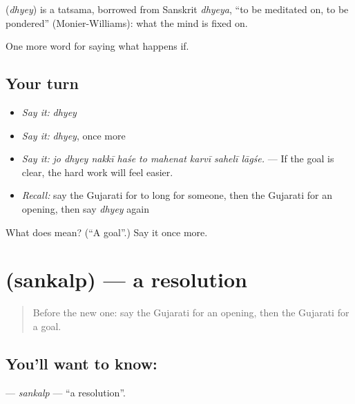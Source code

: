 \begin{cousinweb}
\textbf{} (\emph{dhyey}) is a tatsama, borrowed from Sanskrit \emph{dhyeya}, \textquotedblleft{}to be meditated on, to be pondered\textquotedblright{} (Monier-Williams): what the mind is fixed on.
\end{cousinweb}

\begin{grammarlens}[title={What you've built}]
One more word for saying what happens if.
\end{grammarlens}

\subsection*{Your turn}
\begin{itemize}
\raggedright
  \item \emph{Say it:} \emph{dhyey}
  \item \emph{Say it:} \emph{dhyey}, once more
  \item \emph{Say it:} \emph{jo dhyey nakkī haśe to mahenat karvī sahelī lāgśe.} — If the goal is clear, the hard work will feel easier.
  \item \emph{Recall:} say the Gujarati for to long for someone, then the Gujarati for an opening, then say \emph{dhyey} again
\end{itemize}

\begin{tcolorbox}[breakable,colback=teal!4,colframe=teal!35!black,title={Before you move on}]
What does  mean? (\textquotedblleft{}A goal\textquotedblright{}.) Say it once more.
\end{tcolorbox}
\section[\texorpdfstring{\gu{સંકલ્પ} (sankalp)}{સંકલ્પ (sankalp)}]{ (sankalp) — a resolution}

\label{lesson:GU-C382-sankalp}



\begin{quote}
Before the new one: say the Gujarati for an opening, then the Gujarati for a goal.
\end{quote}

\subsection*{You'll want to know: }
\textbf{} — \emph{sankalp} — \textquotedblleft{}a resolution\textquotedblright{}.


